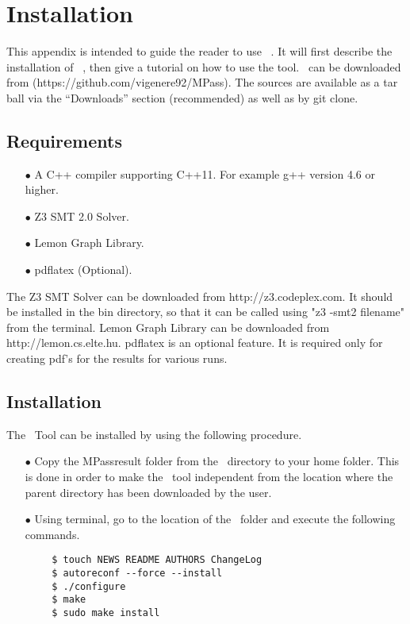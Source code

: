 \newpage
\renewcommand\thesection{\Alph{section}}
\setcounter{section}{0}
\section {Installation}
This appendix is intended to guide the reader to use  \MPass\ . It will first describe the 
installation of \MPass\ , then give a tutorial on how to  use the tool. \MPass\ can be downloaded from \cite{github.MPass} (https://github.com/vigenere92/MPass).
The sources are available as a tar ball via the “Downloads” section (recommended) as well as by git clone.

\subsection{Requirements}
\begin{itemize}
    \item[$\bullet$] A C++ compiler supporting C++11. For example g++ version 4.6 or higher.

    \item[$\bullet$] Z3 SMT 2.0 Solver. 

    \item[$\bullet$] Lemon Graph Library.

    \item[$\bullet$] pdflatex (Optional).
\end{itemize}

The Z3 SMT Solver can be downloaded from  http://z3.codeplex.com. It should be installed in the bin directory, so that it can be called using
"z3 -smt2 filename" from the terminal. Lemon Graph Library can be downloaded from http://lemon.cs.elte.hu. pdflatex is an optional feature. It is required
only for creating pdf's for the results for various runs.


\subsection{Installation}
The \MPass\ Tool can be installed by using the following procedure.
\begin{itemize}
    \item[$\bullet$] Copy the MPass\textunderscore result folder from the \MPass\ directory to your home folder. This is done in order to make the \MPass\ tool independent from the location where the parent directory  has been downloaded by the user.
    \item[$\bullet$] Using terminal, go to the location of the \MPass\ folder and execute the following commands.
\end{itemize}
\begin{Verbatim}
        $ touch NEWS README AUTHORS ChangeLog
        $ autoreconf --force --install
        $ ./configure
        $ make
        $ sudo make install
\end{Verbatim}

